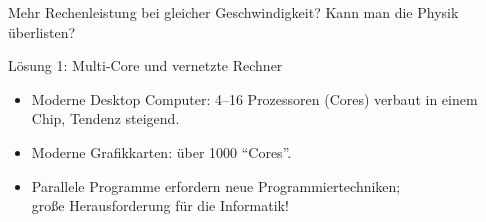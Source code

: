 %
%
%


%
%
%


\begin{frame}

	\begin{alertblock}{Mehr Rechenleistung bei gleicher Geschwindigkeit?}
		Kann man die Physik überlisten?
	\end{alertblock}

\end{frame}

\begin{frame}

	\begin{block}{Lösung 1: Multi-Core und vernetzte Rechner}
		\begin{itemize}
			\item Moderne Desktop Computer: \numrange{4}{16} Prozessoren
				(Cores) verbaut in einem Chip, Tendenz steigend.
			\item Moderne Grafikkarten: über 1000 ``Cores''.
			\item Parallele Programme erfordern neue Programmiertechniken; \\
				\alert{große Herausforderung für die Informatik!}
		\end{itemize}
	\end{block}

\end{frame}

